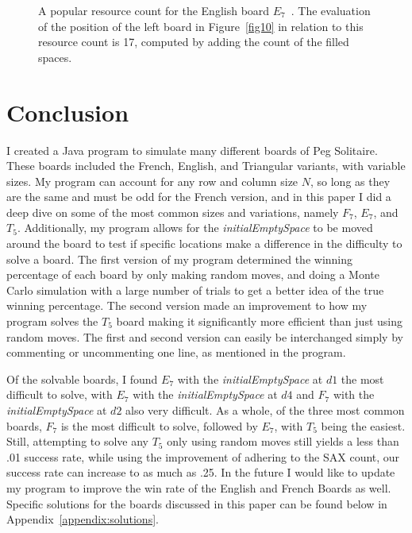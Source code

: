 \documentclass{article}
\begin{document}
\begin{figure}[htb]
\centering
{}
\caption{A popular resource count for the English board $E_7$~\cite{Beasley}. The evaluation of the position of the left board in Figure~\ref{fig10} in relation to this resource count is 17, computed by adding the count of the filled spaces.}
\label{fig11}
\end{figure}

\section{Conclusion}
I created a Java program to simulate many different boards of Peg Solitaire. These boards included the French, English, and Triangular variants, with variable sizes. My program can account for any row and column size $N$, so long as they are the same and must be odd for the French version, and in this paper I did a deep dive on some of the most common sizes and variations, namely $F_7$, $E_7$, and $T_5$. Additionally, my program allows for the \textit{initialEmptySpace} to be moved around the board to test if specific locations make a difference in the difficulty to solve a board. The first version of my program determined the winning percentage of each board by only making random moves, and doing a Monte Carlo simulation with a large number of trials to get a better idea of the true winning percentage. The second version made an improvement to how my program solves the $T_5$ board making it significantly more efficient than just using random moves. The first and second version can easily be interchanged simply by commenting or uncommenting one line, as mentioned in the program.

Of the solvable boards, I found $E_7$ with the \textit{initialEmptySpace} at $d1$ the most difficult to solve, with $E_7$ with the \textit{initialEmptySpace} at $d4$ and $F_7$ with the \textit{initialEmptySpace} at $d2$ also very difficult. As a whole, of the three most common boards, $F_7$ is the most difficult to solve, followed by $E_7$, with $T_5$ being the easiest. Still, attempting to solve any $T_5$ only using random moves still yields a less than .01 success rate, while using the improvement of adhering to the SAX count, our success rate can increase to as much as .25. In the future I would like to update my program to improve the win rate of the English and French Boards as well. Specific solutions for the boards discussed in this paper can be found below in Appendix~\ref{appendix:solutions}.
\end{document}
